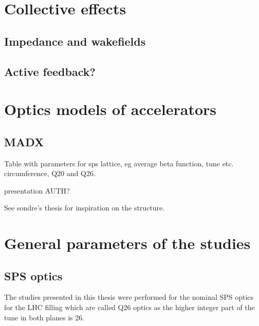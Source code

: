 \section{Collective effects}
\subsection{Impedance and wakefields}

\subsection{Active feedback?}
\section{Optics models of accelerators}
\subsection*{MADX}
Table with parameters for sps lattice, eg average beta function, tune etc. circumference, Q20 and Q26.

presentation AUTH?


See sondre's thesis for inspiration on the structure.
\section{General parameters of the studies}
\subsection{SPS optics}\label{subsec:SPS_optics_model}
 The studies presented in this thesis were performed for the nominal SPS optics for the LHC filling which are called Q26 optics as the higher integer part of the tune in both planes is 26. 

